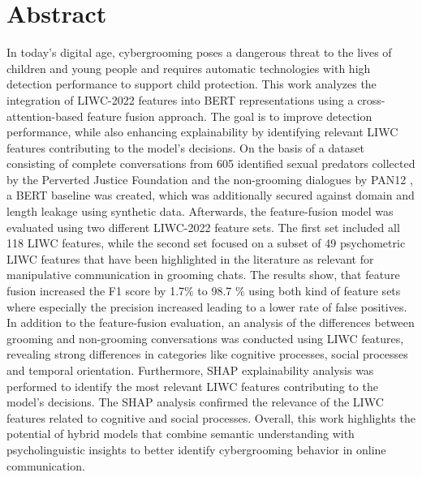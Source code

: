 \chapter{Abstract}

In today's digital age, cybergrooming poses a dangerous threat to the lives of children and young people and requires automatic technologies with high detection performance to support child protection. This work analyzes the integration of LIWC-2022 features \cite{pennebaker2022liwc} into BERT representations \cite{devlin2019bert} using a cross-attention-based feature fusion approach. The goal is to improve detection performance, while also enhancing explainability by identifying relevant LIWC features contributing to the model's decisions. On the basis of a dataset consisting of complete conversations from 605 identified sexual predators collected by the Perverted Justice Foundation and the  non-grooming dialogues by PAN12 \cite{inches2012pan}, a BERT baseline was created, which was additionally secured against domain and length leakage using synthetic data. Afterwards, the feature-fusion model was evaluated using two different LIWC-2022 feature sets. The first set included all 118 LIWC features, while the second set focused on a subset of 49 psychometric LIWC features that have been highlighted in the literature as relevant for manipulative communication in grooming chats. The results show, that feature fusion increased the F1 score by 1.7\% to 98.7 \% using both kind of feature sets where especially the precision increased leading to a lower rate of false positives. In addition to the feature-fusion evaluation, an analysis of the differences between grooming and non-grooming conversations was conducted using LIWC features, revealing strong differences in categories like cognitive processes, social processes and temporal orientation. Furthermore, SHAP \cite{lundberg2017shap} explainability analysis was performed to identify the most relevant LIWC features contributing to the model's decisions. The SHAP analysis confirmed the relevance of the LIWC features related to cognitive and social processes. Overall, this work highlights the potential of hybrid models that combine semantic understanding with psycholinguistic insights to better identify cybergrooming behavior in online communication.

